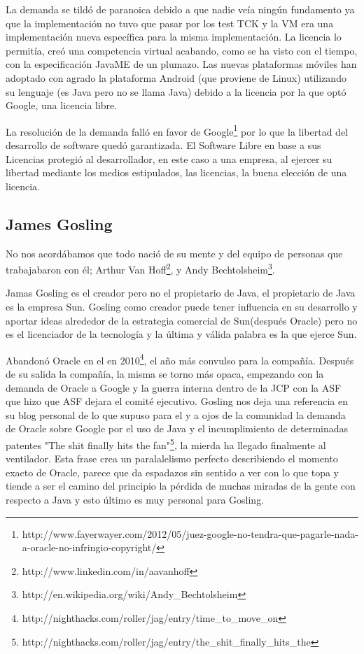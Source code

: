 \documentclass[11pt]{scrartcl}
\begin{document}
La demanda se tildó de paranoica debido a que nadie veía ningún fundamento ya que la implementación no tuvo que pasar por los test TCK y la VM era una implementación nueva específica para la misma implementación. La licencia lo permitía, creó una competencia virtual acabando, como se ha visto con el tiempo, con la especificación JavaME de un plumazo. Las nuevas plataformas móviles han adoptado con agrado la plataforma Android (que proviene de Linux) utilizando su lenguaje (es Java pero no se llama Java) debido a la licencia por la que optó Google, una licencia libre.

La resolución de la demanda falló en favor de Google\footnote{http://www.fayerwayer.com/2012/05/juez-google-no-tendra-que-pagarle-nada-a-oracle-no-infringio-copyright/} por lo que la libertad del desarrollo de software quedó garantizada. El Software Libre en base a sus Licencias protegió al desarrollador, en este caso a una empresa, al ejercer su libertad mediante los medios estipulados, las licencias, la buena elección de una licencia.

\subsection{James Gosling}

No nos acordábamos que todo nació de su mente y del equipo de personas que trabajabaron con él; Arthur Van Hoff\footnote{http://www.linkedin.com/in/aavanhoff}, y Andy Bechtolsheim\footnote{http://en.wikipedia.org/wiki/Andy\_Bechtolsheim}.

Jamas Gosling es el creador pero no el propietario de Java, el propietario de Java es la empresa Sun. Gosling como creador puede tener influencia en su desarrollo y aportar ideas alrededor de la estrategia comercial de Sun(después Oracle) pero no es el licenciador de la tecnología y la última y válida palabra es la que ejerce Sun.

Abandonó Oracle en el en 2010\footnote{http://nighthacks.com/roller/jag/entry/time\_to\_move\_on}, el año más convulso para la compañía. Después de su salida la compañía, la misma se torno más opaca, empezando con la demanda de Oracle a Google y la guerra interna dentro de la JCP con la ASF que hizo que ASF dejara el comité ejecutivo. Gosling nos deja una referencia en su blog personal de lo que supuso para el y a ojos de la comunidad la demanda de Oracle sobre Google por el uso de Java y el incumplimiento de determinadas patentes "The shit finally hits the fan"\footnote{http://nighthacks.com/roller/jag/entry/the\_shit\_finally\_hits\_the}, la mierda ha llegado finalmente al ventilador. Esta frase crea un paralalelismo perfecto describiendo el momento exacto de Oracle, parece que da espadazos sin sentido a ver con lo que topa y tiende a ser el camino del principio la pérdida de muchas miradas de la gente con respecto a Java y esto último es muy personal para Gosling.
\end{document}
